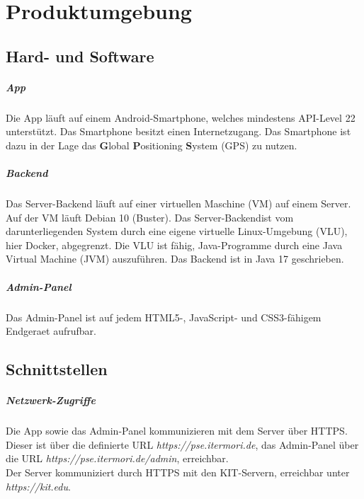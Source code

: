 \newpage
\chapter{Produktumgebung}

\section{Hard- und Software}
    \paragraph{App}
        Die App läuft auf einem \Gls{Android}-\Gls{Smartphone}, welches mindestens \Gls{API-Level} 22 unterstützt.
        Das \Gls{Smartphone} besitzt einen Internetzugang.
        Das \Gls{Smartphone} ist dazu in der Lage das \textbf{G}lobal \textbf{P}ositioning \textbf{S}ystem (\Gls{GPS}) zu nutzen.

    \paragraph{Backend}
        Das \Gls{Server}-\Gls{Backend} läuft auf einer virtuellen Maschine (\Gls{VM}) auf einem \Gls{Server}.
        Auf der \Gls{VM} läuft \Gls{Debian} 10 (Buster).
        Das \Gls{Server}-\Gls{Backend}ist vom darunterliegenden System durch eine eigene virtuelle Linux-Umgebung (\Gls{VLU}), hier \Gls{Docker}, abgegrenzt.
        Die \Gls{VLU} ist fähig, \Gls{Java}-Programme durch eine Java Virtual Machine (\Gls{JVM}) auszuführen.
        Das \Gls{Backend} ist in \Gls{Java} 17 geschrieben.

    \paragraph{Admin-Panel}
        Das \Gls{Admin-Panel} ist auf jedem \Gls{HTML5}-, \Gls{JavaScript}- und \Gls{CSS3}-fähigem \Gls{Endgeraet} aufrufbar.

\section{Schnittstellen}
    \paragraph{Netzwerk-Zugriffe}
        Die App sowie das \Gls{Admin-Panel} kommunizieren mit dem \Gls{Server} über \Gls{HTTPS}. Dieser ist über die definierte \Gls{URL} \textit{https://pse.itermori.de},
        das \Gls{Admin-Panel} über die \Gls{URL} \textit{https://pse.itermori.de/admin}, erreichbar. \\
        Der \Gls{Server} kommuniziert durch \Gls{HTTPS} mit den \Gls{KIT}-Servern, erreichbar unter \textit{https://kit.edu}.
